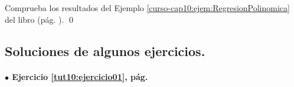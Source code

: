\documentclass[10pt,a4paper]{article}\usepackage[]{graphicx}\usepackage[]{color}
\begin{document}
\begin{ejercicio}
\label{tut10:ejercicio12}
Comprueba los resultados del Ejemplo \ref{curso-cap10:ejem:RegresionPolinomica} del libro (pág. \pageref{curso-cap10:ejem:RegresionPolinomica}).
\qed
\end{ejercicio}




\subsection*{Soluciones de algunos ejercicios.}
\label{tut10:subsec:SolucionesAlgunosEjercicios}


\paragraph{\bf $\bullet$ Ejercicio \ref{tut10:ejercicio01}, pág. \pageref{tut10:ejercicio01}}
\label{tut10:ejercicio01:sol}\quad\\
\end{document}
